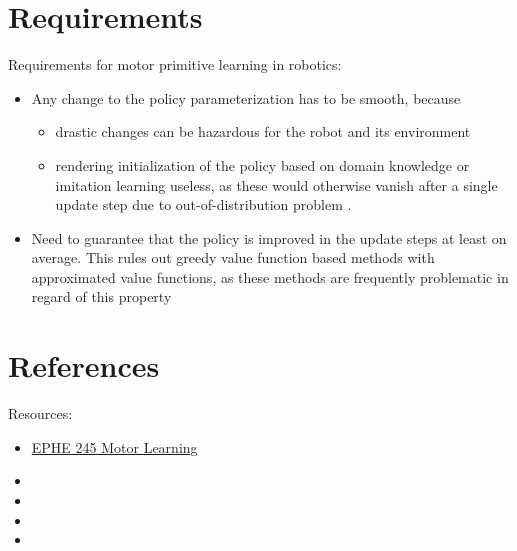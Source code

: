 \section{Requirements}
Requirements for motor primitive learning in robotics: \cite{peters2008nn}
\begin{itemize}
	\item Any change to the policy parameterization has to be smooth, because
	\begin{itemize}
		\item drastic changes can be hazardous for the robot and its environment
		\item rendering initialization of the policy based on domain knowledge or imitation learning useless, as these would otherwise vanish after a single update
		step due to out-of-distribution problem \cite{schaal1996learning}.
	\end{itemize}	
	\item Need to guarantee that the policy is improved in the update steps at least on average. This rules out greedy value function based methods with approximated value functions, as these methods are frequently problematic in regard of this property \cite{kakade2003sample}	
\end{itemize}

\section{References}
Resources:
\begin{itemize}
	\item \href{https://www.youtube.com/channel/UCXSgDUSFyJDDG3L1PcWq8Xg/featured}{EPHE 245 Motor Learning}
	\item {}
	\item {}
	\item {}
	\item {}	
\end{itemize}